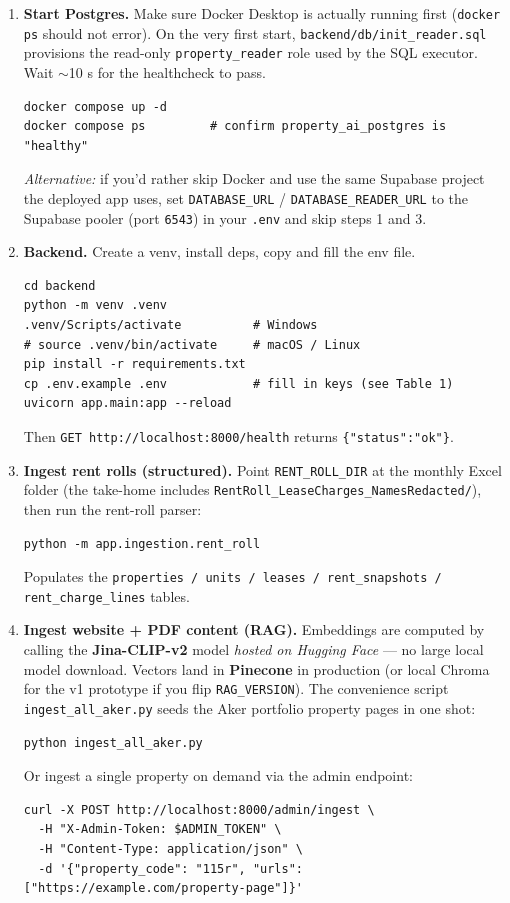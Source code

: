 \documentclass[11pt,a4paper]{article}
\begin{document}
\begin{enumerate}
  \item \textbf{Start Postgres.} Make sure Docker Desktop is actually running first
  (\texttt{docker ps} should not error). On the very first start,
  \texttt{backend/db/init\_reader.sql} provisions the read-only \texttt{property\_reader}
  role used by the SQL executor. Wait $\sim$10 s for the healthcheck to pass.
  \begin{lstlisting}
docker compose up -d
docker compose ps         # confirm property_ai_postgres is "healthy"
  \end{lstlisting}
  \emph{Alternative:} if you'd rather skip Docker and use the same Supabase project the
  deployed app uses, set \texttt{DATABASE\_URL} / \texttt{DATABASE\_READER\_URL} to the
  Supabase pooler (port \texttt{6543}) in your \texttt{.env} and skip steps 1 and 3.

  \item \textbf{Backend.} Create a venv, install deps, copy and fill the env file.
  \begin{lstlisting}
cd backend
python -m venv .venv
.venv/Scripts/activate          # Windows
# source .venv/bin/activate     # macOS / Linux
pip install -r requirements.txt
cp .env.example .env            # fill in keys (see Table 1)
uvicorn app.main:app --reload
  \end{lstlisting}
  Then \texttt{GET http://localhost:8000/health} returns \texttt{\{"status":"ok"\}}.

  \item \textbf{Ingest rent rolls (structured).} Point \texttt{RENT\_ROLL\_DIR} at the
  monthly Excel folder (the take-home includes \texttt{RentRoll\_LeaseCharges\_NamesRedacted/}),
  then run the rent-roll parser:
  \begin{lstlisting}
python -m app.ingestion.rent_roll
  \end{lstlisting}
  Populates the \texttt{properties / units / leases / rent\_snapshots /
  rent\_charge\_lines} tables.

  \item \textbf{Ingest website + PDF content (RAG).} Embeddings are computed by calling
  the \textbf{Jina-CLIP-v2} model \emph{hosted on Hugging Face} --- no large local model
  download. Vectors land in \textbf{Pinecone} in production (or local Chroma for the v1
  prototype if you flip \texttt{RAG\_VERSION}). The convenience script
  \texttt{ingest\_all\_aker.py} seeds the Aker portfolio property pages in one shot:
  \begin{lstlisting}
python ingest_all_aker.py
  \end{lstlisting}
  Or ingest a single property on demand via the admin endpoint:
  \begin{lstlisting}
curl -X POST http://localhost:8000/admin/ingest \
  -H "X-Admin-Token: $ADMIN_TOKEN" \
  -H "Content-Type: application/json" \
  -d '{"property_code": "115r", "urls": ["https://example.com/property-page"]}'
  \end{lstlisting}


\end{enumerate}
\end{document}
